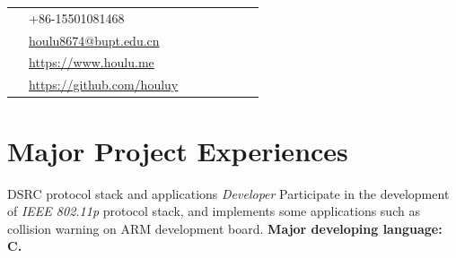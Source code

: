 \documentclass[10pt]{article} %
\begin{document}
\begin{paracol}{2}
\parbox[top][0.12\textheight][c]{\linewidth}{ %
	\vspace{-0.04\textheight} %
	\colorbox{shade}{ %
		\begin{supertabular}{p{0.05\linewidth}|p{0.775\linewidth}} %
			\raisebox{-1pt}{\faPhone} & +86-15501081468 \\ %
			\raisebox{0pt}{\small\faEnvelope} & \href{mailto:houlu8674@bupt.edu.cn}{houlu8674@bupt.edu.cn} \\ %
			\raisebox{-1pt}{\small\faDesktop} & \href{https://www.houlu.me}{https://www.houlu.me} \\ %
			\raisebox{-1pt}{\faGithub} & \href{https://github.com/houluy}{https://github.com/houluy} \\ %
		\end{supertabular}
	}
}

\section{Major Project Experiences}





{} %
{DSRC protocol stack and applications} %
{\textit{Developer}} %
{Participate in the development of \textit{IEEE 802.11p} protocol stack, and implements some applications such as collision warning on ARM development board. \textbf{Major developing language: C.}} %



\end{paracol}
\end{document}
